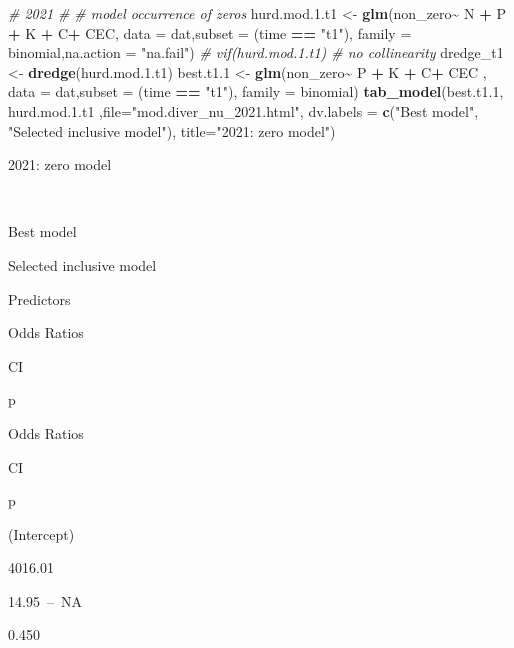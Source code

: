\documentclass[
]{article}
\newenvironment{Shaded}{\begin{snugshade}}{\end{snugshade}}
\newcommand{\AttributeTok}[1]{\textcolor[rgb]{0.13,0.29,0.53}{#1}}
\newcommand{\CommentTok}[1]{\textcolor[rgb]{0.56,0.35,0.01}{\textit{#1}}}
\newcommand{\FloatTok}[1]{\textcolor[rgb]{0.00,0.00,0.81}{#1}}
\newcommand{\FunctionTok}[1]{\textcolor[rgb]{0.13,0.29,0.53}{\textbf{#1}}}
\newcommand{\NormalTok}[1]{#1}
\newcommand{\OtherTok}[1]{\textcolor[rgb]{0.56,0.35,0.01}{#1}}
\newcommand{\SpecialCharTok}[1]{\textcolor[rgb]{0.81,0.36,0.00}{\textbf{#1}}}
\newcommand{\StringTok}[1]{\textcolor[rgb]{0.31,0.60,0.02}{#1}}
\begin{document}
\begin{Shaded}
\begin{Highlighting}[]
\CommentTok{\# 2021 \#}
\CommentTok{\# model occurrence of zeros}
\NormalTok{hurd.mod.}\FloatTok{1.}\NormalTok{t1 }\OtherTok{\textless{}{-}} \FunctionTok{glm}\NormalTok{(non\_zero}\SpecialCharTok{\textasciitilde{}}\NormalTok{ N }\SpecialCharTok{+}\NormalTok{ P }\SpecialCharTok{+}\NormalTok{ K }\SpecialCharTok{+}\NormalTok{ C}\SpecialCharTok{+}\NormalTok{ CEC, }\AttributeTok{data =}\NormalTok{ dat,}\AttributeTok{subset =}\NormalTok{ (time }\SpecialCharTok{==} \StringTok{"t1"}\NormalTok{), }\AttributeTok{family =}\NormalTok{ binomial,}\AttributeTok{na.action =} \StringTok{"na.fail"}\NormalTok{)}
\CommentTok{\# vif(hurd.mod.1.t1) \# no collinearity}
\NormalTok{dredge\_t1 }\OtherTok{\textless{}{-}} \FunctionTok{dredge}\NormalTok{(hurd.mod.}\FloatTok{1.}\NormalTok{t1)}
\NormalTok{best.t1}\FloatTok{.1} \OtherTok{\textless{}{-}} \FunctionTok{glm}\NormalTok{(non\_zero}\SpecialCharTok{\textasciitilde{}}\NormalTok{ P }\SpecialCharTok{+}\NormalTok{ K }\SpecialCharTok{+}\NormalTok{ C}\SpecialCharTok{+}\NormalTok{ CEC , }\AttributeTok{data =}\NormalTok{ dat,}\AttributeTok{subset =}\NormalTok{ (time }\SpecialCharTok{==} \StringTok{"t1"}\NormalTok{), }\AttributeTok{family =}\NormalTok{ binomial)}
\FunctionTok{tab\_model}\NormalTok{(best.t1}\FloatTok{.1}\NormalTok{, hurd.mod.}\FloatTok{1.}\NormalTok{t1 ,}\AttributeTok{file=}\StringTok{"mod.diver\_nu\_2021.html"}\NormalTok{, }\AttributeTok{dv.labels =} \FunctionTok{c}\NormalTok{(}\StringTok{"Best model"}\NormalTok{, }\StringTok{"Selected inclusive model"}\NormalTok{), }\AttributeTok{title=}\StringTok{"2021: zero model"}\NormalTok{)}
\end{Highlighting}
\end{Shaded}

2021: zero model

~

Best model

Selected inclusive model

Predictors

Odds Ratios

CI

p

Odds Ratios

CI

p

(Intercept)

4016.01

14.95~--~NA

0.450
\end{document}

